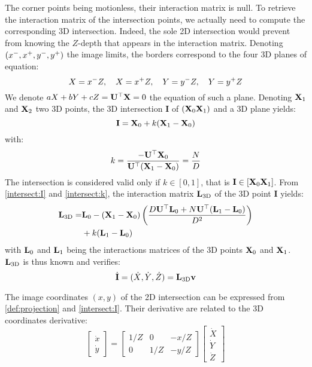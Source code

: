 \documentclass[letterpaper, 10 pt, conference]{IEEEtran}  %
\begin{document}
The corner points being motionless, their interaction matrix is null.
To retrieve the interaction matrix of the intersection points, we actually need to compute the corresponding 3D intersection. Indeed, the sole 2D intersection would prevent from knowing the $Z$-depth that appears in the interaction matrix.
Denoting $(x^-,x^+,y^-,y^+)$ the image limits, the
borders correspond to the four 3D planes of equation:
\begin{equation}
X = x^- Z,  \quad X = x^+ Z, \quad
Y = y^- Z,  \quad Y = y^+ Z
\end{equation}We denote $aX+bY+cZ = \mathbf{U}^\top\mathbf{X} = 0$ 
the equation of such a plane.
Denoting $\mathbf{X}_1$ and $\mathbf{X}_2$ two 3D points, the 3D intersection $\mathbf{I}$ of $(\mathbf{X}_0\mathbf{X}_1)$ and a 3D plane yields:
\begin{equation}\label{intersect:I}
\mathbf{I} = \X_0 + k(\X_1-\X_0)
\end{equation}
with:
\begin{equation}\label{intersect:k}
k = \frac{-\mathbf{U}^\top\X_0}{\mathbf{U}^\top(\X_1-\X_0)} = \frac{N}{D} 
\end{equation}
The intersection is considered valid only if $k\in[0,1]$, that is $\mathbf I \in [\mathbf{X}_0\mathbf{X}_1]$.
From \eqref{intersect:I} and \eqref{intersect:k}, the interaction matrix $\mathbf{L}_{\text{3D}}$ of the 3D point $\mathbf{I}$ yields:
\begin{align}
\mathbf{L}_{\text{3D}} = & \mathbf{L}_0 - (\mathbf{X}_1-\mathbf{X}_0)
\left(\frac
{D\mathbf{U}^\top\mathbf{L}_0 + N\mathbf{U}^\top(\mathbf{L}_1 - \mathbf{L}_0)}
{D^2}\right) \nonumber \\
&+ k(\mathbf{L}_1-\mathbf{L}_0)
\end{align}with $\mathbf{L}_0$ and $\mathbf{L}_1$ being the interactions matrices of the 3D points $\mathbf{X}_0$ and $\mathbf{X}_1$.
$\mathbf{L}_{\text{3D}}$ is thus known and verifies:
\begin{equation}\label{inter:3D}
\dot{\mathbf{I}} = (\dot X, \dot Y, \dot Z) = \L_{\text{3D}} \v
\end{equation}

The image coordinates $(x,y)$ of the 2D intersection can be expressed from \eqref{def:projection} and \eqref{intersect:I}.
Their derivative are related to the 3D coordinates derivative:
\begin{equation}\label{inter:2D3D}
\left[\begin{array}{c} \dot x \\ \dot y\end{array}\right] = \left[\begin{array}{ccc}1/Z & 0 & -x/Z \\ 0 & 1/Z & -y/Z \end{array}\right]
\left[\begin{array}{c} \dot X \\ \dot Y \\ \dot Z\end{array}\right]
\end{equation}
\end{document}
